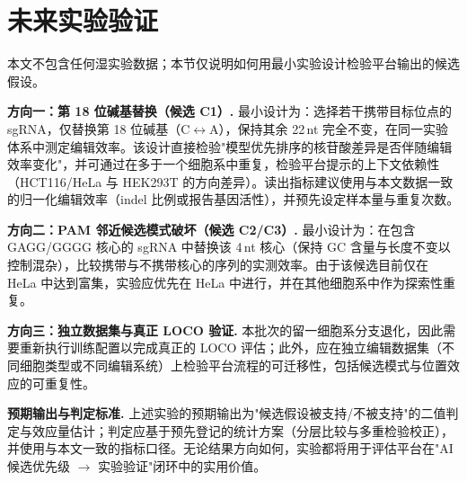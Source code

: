 \section{未来实验验证}
\label{sec:future}

本文不包含任何湿实验数据；本节仅说明如何用最小实验设计检验平台输出的候选假设。

\textbf{方向一：第 18 位碱基替换（候选 C1）.} 最小设计为：选择若干携带目标位点的 sgRNA，仅替换第 18 位碱基（C$\leftrightarrow$A），保持其余 22\,nt 完全不变，在同一实验体系中测定编辑效率。该设计直接检验"模型优先排序的核苷酸差异是否伴随编辑效率变化"，并可通过在多于一个细胞系中重复，检验平台提示的上下文依赖性（HCT116/HeLa 与 HEK293T 的方向差异）。读出指标建议使用与本文数据一致的归一化编辑效率（indel 比例或报告基因活性），并预先设定样本量与重复次数。

\textbf{方向二：PAM 邻近候选模式破坏（候选 C2/C3）.} 最小设计为：在包含 GAGG/GGGG 核心的 sgRNA 中替换该 4\,nt 核心（保持 GC 含量与长度不变以控制混杂），比较携带与不携带核心的序列的实测效率。由于该候选目前仅在 HeLa 中达到富集，实验应优先在 HeLa 中进行，并在其他细胞系中作为探索性重复。

\textbf{方向三：独立数据集与真正 LOCO 验证.} 本批次的留一细胞系分支退化，因此需要重新执行训练配置以完成真正的 LOCO 评估；此外，应在独立编辑数据集（不同细胞类型或不同编辑系统）上检验平台流程的可迁移性，包括候选模式与位置效应的可重复性。

\textbf{预期输出与判定标准.} 上述实验的预期输出为"候选假设被支持/不被支持"的二值判定与效应量估计；判定应基于预先登记的统计方案（分层比较与多重检验校正），并使用与本文一致的指标口径。无论结果方向如何，实验都将用于评估平台在"AI 候选优先级 $\rightarrow$ 实验验证"闭环中的实用价值。
